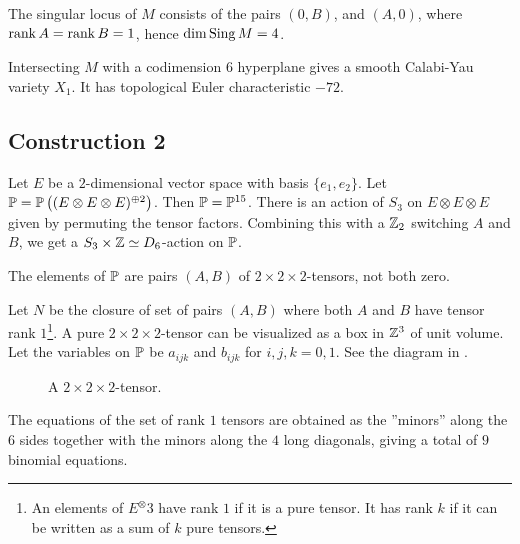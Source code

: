 \documentclass[11pt, english]{article}
\begin{document}
The singular locus of $M$ consists of the pairs $(0,B)$, and $(A,0)$, where $\operatorname{\mathrm{rank}} A= \operatorname{\mathrm{rank}} B = 1$, hence $\dim \operatorname{Sing} M = 4$.

Intersecting $M$ with a codimension $6$ hyperplane gives a smooth Calabi-Yau variety $X_1$. It has topological Euler characteristic $-72$. 


\subsection{Construction 2}

Let $E$ be a $2$-dimensional vector space with basis $\{e_1,e_2\}$. Let $\mathbb{P}=\mathbb{P}\left((E \otimes E \otimes E)^{\oplus 2}\right)$. Then $\mathbb{P}=\mathbb{P}^{15}$. There is an action of $S_3$ on $E \otimes E \otimes E$ given by permuting the tensor factors. Combining this with a $\mathbb{Z}_2$ switching $A$ and $B$, we get a $S_3 \times \mathbb{Z} \simeq D_6$-action on $\mathbb{P}$. 

The elements of $\mathbb{P}$ are pairs $(A,B)$ of $2 \times 2 \times 2$-tensors, not both zero. 

Let $N$ be the closure of set of pairs $(A,B)$ where both $A$ and $B$ have tensor rank $1$\footnote{An elements of $E^\otimes 3$ have rank $1$ if it is a pure tensor. It has rank $k$ if it can be written as a sum of $k$ pure tensors.}. A pure $2 \times 2 \times 2$-tensor can be visualized as a box in $\mathbb{Z}^3$ of unit volume. Let the variables on $\mathbb{P}$ be $a_{ijk}$ and $b_{ijk}$ for $i,j,k=0,1$. See the diagram in .

\begin{figure}
\centering
{}
\caption{A $2 \times 2 \times 2$-tensor.}
\label{fig:222tensor}
\end{figure}

The equations of the set of rank $1$ tensors are obtained as the ''minors'' along the $6$ sides together with the minors along the $4$ long diagonals, giving a total of $9$ binomial equations. 
\end{document}
